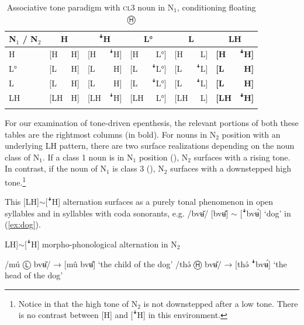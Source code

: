 \documentclass[output=paper,colorlinks,citecolor=brown,draft,draftmode]{langscibook}
\begin{document}
\begin{table}
\caption{Associative tone paradigm with \textsc{cl3} noun in N$_1$,  conditioning floating Ⓗ}
\label{tab:non1assoc}
 \begin{tabularx}{.9\textwidth}{X lr lr lr lr lr}
  \lsptoprule
N$_1$ / N$_2$  & \multicolumn{2}{c}{H} &  \multicolumn{2}{c}{ꜜH} & \multicolumn{2}{c}{L°}  &\multicolumn{2}{c}{L}  & \multicolumn{2}{c}{\textbf{LH}} \\
 \midrule
H &   {[}H & H{]} & {[}H & ꜜH{]} & {[}H & L°{]} & {[}H & L{]} & \textbf{{[}H} & \textbf{ꜜH{]}} \\
L°   & {[}L & H{]} & {[}L & H{]} & {[}L & ꜜL°{]} & {[}L & ꜜL{]} & \textbf{{[}L }& \textbf{H{]}} \\
L &   {[}L & H{]} & {[}L & H{]} & {[}L & ꜜL°{]} & {[}L & ꜜL{]} & \textbf{{[}L} & \textbf{H{]}} \\
LH &   {[}LH & H{]} & {[}LH & ꜜH{]} & {[}LH & L°{]} & {[}LH & L{]} & \textbf{{[}LH }& \textbf{ꜜH{]}} \\
  \lspbottomrule
 \end{tabularx}
\end{table}

For our examination of tone-driven epenthesis, the relevant portions of both these tables are the rightmost columns (in bold).
For nouns in N$_2$ position with an underlying LH pattern, there are two surface realizations depending on the noun class of N$_1$.
If a class 1 noun is in N$_1$ position  (), N$_2$ surfaces with a rising tone.
In contrast, if the noun of N$_1$ is class 3 (), N$_2$ surfaces with a downstepped high tone.\footnote{Notice in  that the high tone of N$_2$ is not downstepped after a low tone. There is no contrast between [H] and [ꜜH] in this environment.}

This [LH]$\sim$[ꜜH] alternation surfaces as a purely tonal phenomenon in open syllables and in syllables with coda sonorants, e.g. /bvʉ̌/
[bvʉ̌]
$\sim$
[ꜜbvʉ́]
`dog' in (\ref{ex:dog}).

\begin{exe}
	\ex {[}LH{]}$\sim${[}ꜜH{]} morpho-phonological alternation in N$_2$  \label{ex:dog}
	    \begin{xlist}
		\ex 
		    /m\'{u} Ⓛ   bv\v{ʉ}/ → [m\^{u} bv\v{ʉ}] `the child of the dog' \citep[264]{nissim1981}
        \ex 
		    /th\'ə   Ⓗ  bv\v{ʉ}/ → [th\'ə ꜜbv\'{ʉ}] `the head of the dog' \citep[153]{nissim1981}
	    \end{xlist}
\end{exe}
\end{document}

